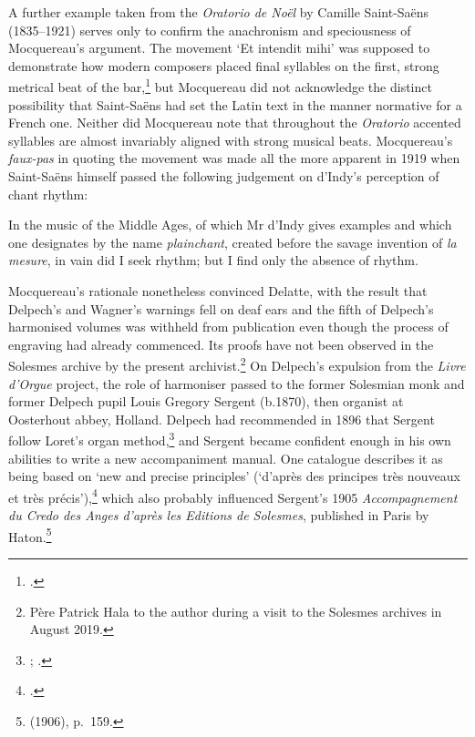 A further example taken from the \emph{Oratorio de Noël} by Camille Saint-Saëns (1835--1921) serves only to confirm the anachronism and speciousness of Mocquereau's argument.
The movement `Et intendit mihi' was supposed to demonstrate how modern composers placed final syllables on the first, strong metrical beat of the bar,\footcite[7:32--3]{MocquereauPaleographiemusicale1901} but Mocquereau did not acknowledge the distinct possibility that Saint-Saëns had set the Latin text in the manner normative for a French one.
\label{ln:moc_lastsyllable}%
Neither did Mocquereau note that throughout the \emph{Oratorio} accented syllables are almost invariably aligned with strong musical beats.
Mocquereau's \emph{faux-pas} in quoting the movement was made all the more apparent in 1919 when Saint-Saëns himself passed the following judgement on d'Indy's perception of chant rhythm:

  {\cite[13]{Saint-SaensideesVincentIndy1919}}
{In the music of the Middle Ages, of which Mr d'Indy gives examples and which one designates by the name \emph{plainchant}, created before the savage invention of \emph{la mesure}, in vain did I seek rhythm; but I find only the absence of rhythm.}

Mocquereau's rationale nonetheless convinced Delatte, with the result that Delpech's and Wagner's warnings fell on deaf ears and the fifth of Delpech's harmonised volumes was withheld from publication even though the process of engraving had already commenced.
Its proofs have not been observed in the Solesmes archive by the present archivist.\footnote{Père Patrick Hala to the author during a visit to the Solesmes archives in August 2019.}
On Delpech's expulsion from the \emph{Livre d'Orgue} project, the role of harmoniser passed to the former Solesmian monk and former Delpech pupil Louis Gregory Sergent (b.1870), then organist at Oosterhout abbey, Holland.
Delpech had recommended in 1896 that Sergent follow Loret's organ method,\footnote{; \covid{}\cite[20]{OchseOrpha[Caroline]NineteenthCenturyOrganTutors2007}.} and Sergent became confident enough in his own abilities to write a new accompaniment manual.
One catalogue describes it as being based on `new and precise principles' (`d'après des principes très nouveaux et très précis'),\footcite[4]{Joubertmaitrescontemporainsorgue1912} which also probably influenced Sergent's 1905 \covid{}\emph{Accompagnement du Credo des Anges d'après les Editions de Solesmes}, published in Paris by Haton.\footnote{\cite{BibliographieBenedictinscongregation1906} (1906), p.~159.}

